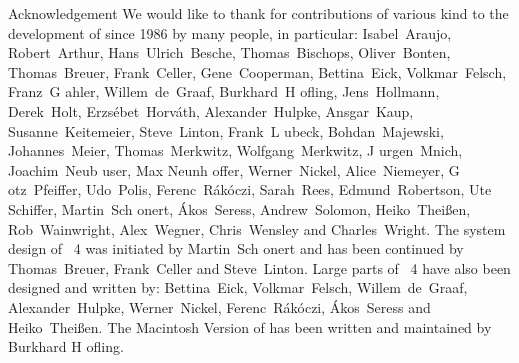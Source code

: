 {\obeylines
{\secfont Acknowledgement}
\bigskip
We would like to thank for contributions of various kind to the development
of {\GAP} since 1986 by many people, in particular:
\medskip
Isabel~Araujo, Robert~Arthur, Hans~Ulrich~Besche, Thomas~Bischops,
Oliver~Bonten, Thomas~Breuer, Frank~Celler, Gene~Cooperman, Bettina~Eick,
Volkmar~Felsch, Franz~G{ a}hler, Willem~de~Graaf, Burkhard~H{ o}fling,
Jens~Hollmann, Derek~Holt, Erzs{\'e}bet~Horv{\'a}th, Alexander~Hulpke, Ansgar~Kaup,
Susanne~Keitemeier, Steve~Linton, Frank~L{ u}beck, Bohdan~Majewski,
Johannes~Meier, Thomas~Merkwitz, Wolfgang~Merkwitz, J{ u}rgen~Mnich,
Joachim~Neub{ u}ser, Max Neunh{ o}ffer, Werner~Nickel, Alice~Niemeyer,
G{ o}tz~Pfeiffer, Udo~Polis, Ferenc~R{\'a}k{\'o}czi, Sarah~Rees, Edmund~Robertson,
Ute Schiffer, Martin~Sch{ o}nert, {\'A}kos~Seress, Andrew~Solomon, Heiko~Thei{\ss}en,
Rob~Wainwright, Alex~Wegner, Chris~Wensley  and Charles~Wright.
\bigskip \bigskip \bigskip
The system design of {\GAP}~4 was initiated by
Martin~Sch{ o}nert and has been continued by
Thomas~Breuer, Frank~Celler and Steve~Linton.
\bigskip
Large parts of {\GAP}~4 have also been designed and written by:
\medskip
Bettina~Eick, Volkmar~Felsch, Willem~de~Graaf, Alexander~Hulpke,
Werner~Nickel, Ferenc~R{\'a}k{\'o}czi, {\'A}kos~Seress and Heiko~Thei{\ss}en.
\bigskip
The Macintosh Version of {\GAP} has been written and maintained by Burkhard
H{ o}fling.
}
